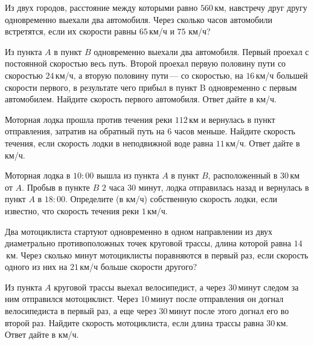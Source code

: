 \begin{class}[number=7]
	\begin{listofex}
		\item Из двух городов, расстояние между которыми равно \(560\) км, навстречу друг другу одновременно выехали два автомобиля. Через сколько часов автомобили встретятся, если их скорости равны \(65\) км/ч и \(75\) км/ч?
		\item Из пункта \(A\) в пункт \(B\) одновременно выехали два автомобиля. Первый проехал с постоянной скоростью весь путь. Второй проехал первую половину пути со скоростью \(24\) км/ч, а вторую половину пути --- со скоростью, на \(16\) км/ч большей скорости первого, в результате чего прибыл в пункт B одновременно с первым автомобилем. Найдите скорость первого автомобиля. Ответ дайте в км/ч.
		
		\item Моторная лодка прошла против течения реки \(112\) км и вернулась в пункт отправления, затратив на обратный путь на \(6\) часов меньше. Найдите скорость течения, если скорость лодки в неподвижной воде равна \(11\) км/ч. Ответ дайте в км/ч.
		\item Моторная лодка в \(10:00\) вышла из пункта \(A\) в пункт \(B\), расположенный в \(30\) км от \(A\). Пробыв в пункте \(B\) \(2\) часа \(30\) минут, лодка отправилась назад и вернулась в пункт \(A\) в \(18:00\). Определите (в км/ч) собственную скорость лодки, если известно, что скорость течения реки \(1\) км/ч.
		\item Два мотоциклиста стартуют одновременно в одном направлении из двух диаметрально противоположных точек круговой трассы, длина которой равна \(14\) км. Через сколько минут мотоциклисты поравняются в первый раз, если скорость одного из них на \(21\) км/ч больше скорости другого?
		\item Из пункта \(A\) круговой трассы выехал велосипедист, а через \(30\) минут следом за ним отправился мотоциклист. Через \(10\) минут после отправления он догнал велосипедиста в первый раз, а еще через \(30\) минут после этого догнал его во второй раз. Найдите скорость мотоциклиста, если длина трассы равна \(30\) км. Ответ дайте в км/ч.
		

\end{listofex}
\end{class}
